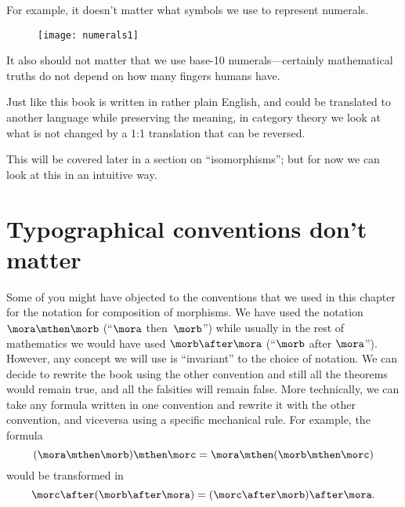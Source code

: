 For example, it doesn't matter what symbols we use to represent numerals.
%
\begin{figure}[h!]
	\texttt{[image: numerals1]}
\end{figure}
%
It also should not matter that we use base-10 numerals---certainly mathematical truths do not depend on how many fingers humans have.

Just like this book is written in rather plain English, and could be translated to another language while preserving the meaning, in category theory we look at what is not changed by a 1:1 translation that can be reversed.

This will be covered later in a section on ``isomorphisms''; but for now we can look at this in an intuitive way.

\section[Typographical conventions]{Typographical conventions don't matter}

Some of you might have objected to the conventions that we used in this chapter for the notation for composition of morphisms.
We have used the notation $\mora \mthen \morb$ (``$\mora$ then~$\morb$'') while usually in the rest of mathematics we would have used $\morb \after \mora$ (``$\morb$ after $\mora$'').
However, any concept we will use is ``invariant'' to the choice of notation.
We can decide to rewrite the book using the other convention and still all the theorems would remain true, and all the falsities will remain false.
More technically, we can take any formula written in one convention and rewrite it with the other convention, and viceversa using a specific mechanical rule.
For example, the formula
%
\begin{equation*}
	(\mora \mthen \morb)
	\mthen \morc = \mora \mthen (\morb \mthen \morc)
\end{equation*}
%
would be transformed in
%
\begin{equation*}
	\morc \after (\morb \after \mora) = (\morc \after \morb) \after \mora.
\end{equation*}

